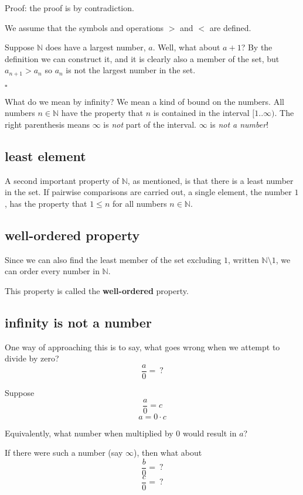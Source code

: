 \documentclass[11pt, oneside]{article}
\begin{document}
Proof:  the proof is by contradiction.

We assume that the symbols and operations $>$ and $<$ are defined.

Suppose $\mathbb{N}$ does have a largest number, $a$.  Well, what about $a + 1$?  By the definition we can construct it, and it is clearly also a member of the set, but $a_{n+1} > a_n$ so $a_n$ is not the largest number in the set.

$\square$

What do we mean by infinity?  We mean a kind of bound on the numbers.  All numbers $n \in \mathbb{N}$ have the property that $n$ is contained in the interval $[1..\infty)$.  The right parenthesis means $\infty$ is \emph{not} part of the interval.  $\infty$ is \emph{not a number}!

\subsection*{least element}

A second important property of $\mathbb{N}$, as mentioned, is that there is a least number in the set.  If pairwise comparisons are carried out, a single element, the number $1$, has the property that $1 \le n$ for all numbers $n \in \mathbb{N}$.

\subsection*{well-ordered property}

Since we can also find the least member of the set excluding $1$, written $\mathbb{N} \setminus 1$, we can order every number in $\mathbb{N}$.  

This property is called the \textbf{well-ordered} property.

\subsection*{infinity is not a number}

One way of approaching this is to say, what goes wrong when we attempt to divide by zero?
\[ \frac{a}{0} = \ ? \]

Suppose 
\[ \frac{a}{0} = c \]
\[ a = 0 \cdot c \]

Equivalently, what number when multiplied by $0$ would result in $a$?

If there were such a number (say $\infty$), then what about 
\[ \frac{b}{0} = \ ? \]
\[ \frac{c}{0} = \ ? \]
\end{document}
